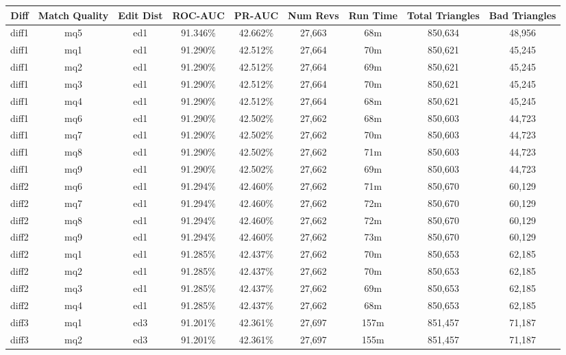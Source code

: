 \begin{sidewaystable}[!tp]
  \begin{center}
    \begin{tabular}{|c|c|c||c|c||c|c|c|c|}
\hline
Diff & Match Quality & Edit Dist
        & ROC-AUC & PR-AUC
        & Num Revs & Run Time
        & Total Triangles & Bad Triangles \\
\hline
\hline
diff1 & mq5 & ed1 & 91.346\% & 42.662\% & 27,663 & 68m & 850,634 & 48,956 \\
diff1 & mq1 & ed1 & 91.290\% & 42.512\% & 27,664 & 70m & 850,621 & 45,245 \\
diff1 & mq2 & ed1 & 91.290\% & 42.512\% & 27,664 & 69m & 850,621 & 45,245 \\
diff1 & mq3 & ed1 & 91.290\% & 42.512\% & 27,664 & 70m & 850,621 & 45,245 \\
diff1 & mq4 & ed1 & 91.290\% & 42.512\% & 27,664 & 68m & 850,621 & 45,245 \\
diff1 & mq6 & ed1 & 91.290\% & 42.502\% & 27,662 & 68m & 850,603 & 44,723 \\
diff1 & mq7 & ed1 & 91.290\% & 42.502\% & 27,662 & 70m & 850,603 & 44,723 \\
diff1 & mq8 & ed1 & 91.290\% & 42.502\% & 27,662 & 71m & 850,603 & 44,723 \\
diff1 & mq9 & ed1 & 91.290\% & 42.502\% & 27,662 & 69m & 850,603 & 44,723 \\
diff2 & mq6 & ed1 & 91.294\% & 42.460\% & 27,662 & 71m & 850,670 & 60,129 \\
diff2 & mq7 & ed1 & 91.294\% & 42.460\% & 27,662 & 72m & 850,670 & 60,129 \\
diff2 & mq8 & ed1 & 91.294\% & 42.460\% & 27,662 & 72m & 850,670 & 60,129 \\
diff2 & mq9 & ed1 & 91.294\% & 42.460\% & 27,662 & 73m & 850,670 & 60,129 \\
diff2 & mq1 & ed1 & 91.285\% & 42.437\% & 27,662 & 70m & 850,653 & 62,185 \\
diff2 & mq2 & ed1 & 91.285\% & 42.437\% & 27,662 & 70m & 850,653 & 62,185 \\
diff2 & mq3 & ed1 & 91.285\% & 42.437\% & 27,662 & 69m & 850,653 & 62,185 \\
diff2 & mq4 & ed1 & 91.285\% & 42.437\% & 27,662 & 68m & 850,653 & 62,185 \\
diff3 & mq1 & ed3 & 91.201\% & 42.361\% & 27,697 & 157m & 851,457 & 71,187 \\
diff3 & mq2 & ed3 & 91.201\% & 42.361\% & 27,697 & 155m & 851,457 & 71,187 \\

\end{tabular}
\end{center}
\end{sidewaystable}

